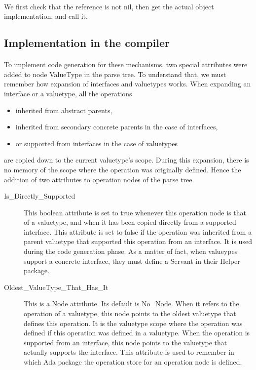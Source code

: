 \paragraph{}We first check that the reference is not nil, then get the
actual object implementation, and call it.

\subsection{Implementation in the compiler}

\paragraph{}To implement code generation for these mechanisms, two
special attributes were added to node ValueType in the parse tree. To
understand that, we must remember how expansion of interfaces and
valuetypes works. When expanding an interface or a valuetype, all the
operations
\begin{itemize}
\item inherited from abstract parents,
\item inherited from secondary concrete parents in the case of
interfaces,
\item or supported from interfaces in the case of valuetypes
\end{itemize}
are copied down to the current valuetype's scope. During this
expansion, there is no memory of the scope where the operation was
originally defined. Hence the addition of two attributes to operation
nodes of the parse tree.

\begin{description}
\item[Is\_Directly\_Supported] This boolean attribute is set to true
whenever this operation node is that of a valuetype, and when it has
been copied directly from a supported interface. This attribute is
set to false if the operation was inherited from a parent valuetype
that supported this operation from an interface. It is used during the
code generation phase. As a matter of fact, when valueypes support a concrete
interface, they must define a Servant in their Helper package.
\item[Oldest\_ValueType\_That\_Has\_It] This is a Node attribute. Its
default is No\_Node. When it refers to the operation of a valuetype,
this node points to the oldest valuetype that defines this
operation. It is the valuetype scope where the operation was defined
if this operation was defined in a valuetype. When the operation is
supported from an interface, this node points to the valuetype that
actually supports the interface. This attribute is used to remember
in which Ada package the operation store for an operation node is defined.
\end{description}

